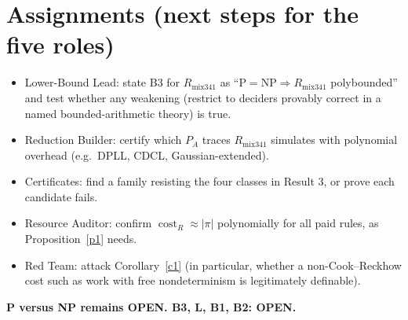\documentclass{article}
\begin{document}
\section*{Assignments (next steps for the five roles)}
\begin{itemize}
\item Lower-Bound Lead: state B3 for $R_{\mathrm{mix}341}$ as ``$\mathrm P=\mathrm{NP}\Rightarrow R_{\mathrm{mix}341}$ polybounded'' and test whether any weakening (restrict to deciders provably correct in a named bounded-arithmetic theory) is true.
\item Reduction Builder: certify which $P_A$ traces $R_{\mathrm{mix}341}$ simulates with polynomial overhead (e.g.\ DPLL, CDCL, Gaussian-extended).
\item Certificates: find a family resisting the four classes in Result 3, or prove each candidate fails.
\item Resource Auditor: confirm $\operatorname{cost}_R\approx|\pi|$ polynomially for all paid rules, as Proposition~\ref{p1} needs.
\item Red Team: attack Corollary~\ref{c1} (in particular, whether a non-Cook--Reckhow cost such as work with free nondeterminism is legitimately definable).
\end{itemize}
\textbf{P versus NP remains OPEN. B3, L, B1, B2: OPEN.}
\end{document}
